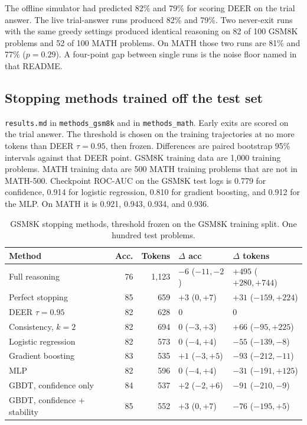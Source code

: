 The offline simulator had predicted 82\% and 79\% for scoring DEER on the trial answer.
The live trial-answer runs produced 82\% and 79\%.
Two never-exit runs with the same greedy settings produced identical reasoning on 82 of 100 GSM8K problems and 52 of 100 MATH problems.
On MATH those two runs are 81\% and 77\% ($p=0.29$).
A four-point gap between single runs is the noise floor named in that README.

\subsection{Stopping methods trained off the test set}
\texttt{results.md} in \texttt{methods\_gsm8k} and in \texttt{methods\_math}.
Early exits are scored on the trial answer.
The threshold is chosen on the training trajectories at no more tokens than DEER $\tau=0.95$, then frozen.
Differences are paired bootstrap 95\% intervals against that DEER point.
GSM8K training data are 1{,}000 training problems.
MATH training data are 500 MATH training problems that are not in MATH-500.
Checkpoint ROC-AUC on the GSM8K test logs is 0.779 for confidence, 0.914 for logistic regression, 0.810 for gradient boosting, and 0.912 for the MLP.
On MATH it is 0.921, 0.943, 0.934, and 0.936.

\begin{table}[!t]
\caption{GSM8K stopping methods, threshold frozen on the GSM8K training split. One hundred test problems.}
\label{tab:meth-gsm}
\centering
\scriptsize
\begin{tabular}{@{}lrrll@{}}
\toprule
Method & Acc. & Tokens & $\Delta$ acc & $\Delta$ tokens \\
\midrule
Full reasoning & 76 & 1{,}123 & $-6$ ($-11,-2$) & $+495$ ($+280,+744$) \\
Perfect stopping & 85 & 659 & $+3$ ($0,+7$) & $+31$ ($-159,+224$) \\
DEER $\tau=0.95$ & 82 & 628 & 0 & 0 \\
Consistency, $k=2$ & 82 & 694 & $0$ ($-3,+3$) & $+66$ ($-95,+225$) \\
Logistic regression & 82 & 573 & $0$ ($-4,+4$) & $-55$ ($-139,-8$) \\
Gradient boosting & 83 & 535 & $+1$ ($-3,+5$) & $-93$ ($-212,-11$) \\
MLP & 82 & 596 & $0$ ($-4,+4$) & $-31$ ($-191,+125$) \\
GBDT, confidence only & 84 & 537 & $+2$ ($-2,+6$) & $-91$ ($-210,-9$) \\
GBDT, confidence + stability & 85 & 552 & $+3$ ($0,+7$) & $-76$ ($-195,+5$) \\
\bottomrule
\end{tabular}
\end{table}

